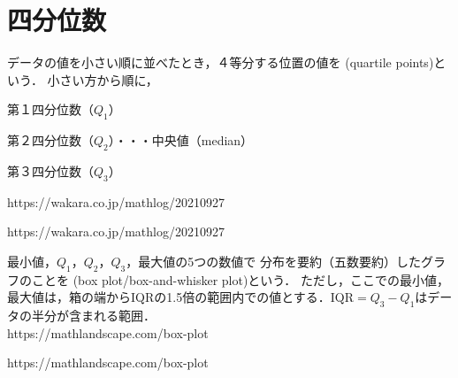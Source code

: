\newcommand{\Draft}{}
\newcommand{\Slide}{}
\newcommand{\PrintLecture}{1}
\newcommand{\PrintSolution}{1}








\maketitle

\MyFrame{}{\tableofcontents}


\section{四分位数}

\MyFrame{}
{
  {
    データの値を小さい順に並べたとき，４等分する位置の値を
    (quartile points)という．
    小さい方から順に，
    \MyItems
    {
      \item 第１四分位数（$Q_1$）
      \item 第２四分位数（$Q_2$）・・・中央値（median）
      \item 第３四分位数（$Q_3$）
    }
  }
  {https://wakara.co.jp/mathlog/20210927}
}

\MyFrame{\insertsection}
{
  {https://wakara.co.jp/mathlog/20210927}
}

\MyFrame{}
{
  {
    最小値，$Q_1$，$Q_2$，$Q_3$，最大値の5つの数値で
    分布を要約（五数要約）したグラフのことを
    (box plot/box-and-whisker plot)という．
  }
  ただし，ここでの最小値，最大値は，箱の端から\alert{IQRの1.5倍の範囲内}での値とする．IQR$=Q_3-Q_1$はデータの半分が含まれる範囲．\\
  {https://mathlandscape.com/box-plot}
}

{
  {https://mathlandscape.com/box-plot}
}

